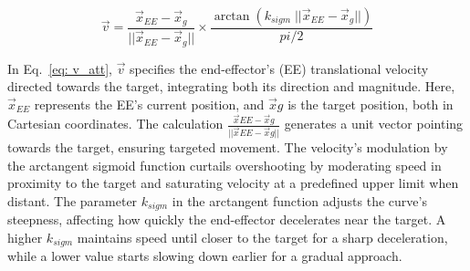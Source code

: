 \documentclass[letterpaper, 10 pt, conference]{ieeeconf}  %
\begin{document}
\begin{equation} 
	\vec{v} = \frac{\vec{x}_{EE} - \vec{x}_g}{||\vec{x}_{EE} - \vec{x}_g||} \times \frac{\arctan(k_{sigm} \; ||\vec{x}_{EE} - \vec{x}_g||) }{pi/2}
	\label{eq: v_att}
\end{equation}



In Eq.~\ref{eq: v_att}, $\vec{v}$ specifies the end-effector's (EE) translational velocity directed towards the target, integrating both its direction and magnitude. Here, $\vec{x}_{EE}$ represents the EE's current position, and $\vec{x}g$ is the target position, both in Cartesian coordinates. The calculation $\frac{\vec{x}{EE}-\vec{x}g}{||\vec{x}{EE}-\vec{x}g||}$ generates a unit vector pointing towards the target, ensuring targeted movement. The velocity's modulation by the arctangent sigmoid function curtails overshooting by moderating speed in proximity to the target and saturating velocity at a predefined upper limit when distant. The parameter \(k_{sigm}\) in the arctangent function adjusts the curve's steepness, affecting how quickly the end-effector decelerates near the target. A higher \(k_{sigm}\) maintains speed until closer to the target for a sharp deceleration, while a lower value starts slowing down earlier for a gradual approach. 

\end{document}

